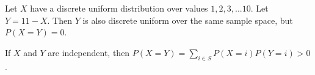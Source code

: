 Let $X$ have a discrete uniform distribution over values ${1, 2, 3, ... 10}$.
Let $Y=11-X$. Then $Y$ is also discrete uniform over the same sample space, but
$P(X=Y) = 0$.

If $X$ and $Y$ are independent, then $P(X=Y) = \sum_{i \in S}P(X=i)P(Y=i) > 0$.